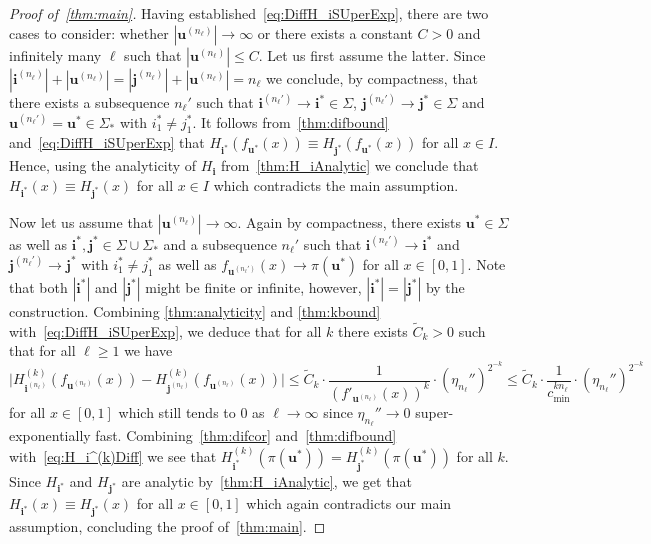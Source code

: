 \documentclass[12pt,]{article}
\def\cref#1{\ref{#1}}%
\theoremstyle{definition}
\theoremstyle{remark}
\newcommand{\0}{\mathbf{0}}
\newcommand{\bi}{\mathbf{i}}
\newcommand{\bj}{\mathbf{j}}
\newcommand{\bu}{\mathbf{u}}
\begin{document}
\begin{proof}[Proof of~\cref{thm:main}]
Having established~\cref{eq:DiffH_iSUperExp}, there are two cases to consider: whether
$|\bu^{(n_\ell)}| \to \infty$ or there exists a constant $C>0$ and infinitely many $\ell$ such that
$|\bu^{(n_\ell)}| \leq C$. Let us first assume the latter. Since $|\bi^{(n_\ell)}|+ |\bu^{(n_\ell)}|
= |\bj^{(n_\ell)}|+|\bu^{(n_\ell)}| = n_\ell$ we conclude, by compactness, that
there exists a subsequence $n_\ell'$ such that $\bi^{(n_\ell')} \to \bi^*\in\Sigma$,
$\bj^{(n_\ell')}\to\bj^*\in\Sigma$ and $\bu^{(n_\ell')}=\bu^*\in\Sigma_*$ with $i_1^*\neq j_1^*$.
It follows from~\cref{thm:difbound} and~\cref{eq:DiffH_iSUperExp} that
$
  H_{\bi^*}(f_{\bu^*}(x))\equiv H_{\bj^*}(f_{\bu^*}(x))
$
for all $x\in I$.  Hence, using the analyticity of $H_{\bi}$ from~\cref{thm:H_iAnalytic} we conclude
that $H_{\bi^*}(x) \equiv H_{\bj^*}(x)$ for all $x\in I$ which contradicts the main assumption.

Now let us assume that $|\bu^{(n_\ell)}| \to \infty$. Again by compactness, there exists
$\bu^*\in\Sigma$ as well as $\bi^*,\bj^*\in\Sigma\cup\Sigma_*$  and a
subsequence $n_\ell'$ such that $\bi^{(n_\ell')}\to \bi^*$ and $\bj^{(n_\ell')}\to \bj^*$ with
$i_1^*\neq j_1^*$ as well as $f_{\bu^{(n_\ell')}}(x) \to \pi(\bu^*)$ for all $x\in[0,1]$. Note that both $|\bi^*|$ and
	$|\bj^*|$ might be finite or infinite, however, $|\bi^*|=|\bj^*|$ by the construction. Combining
\cref{thm:analyticity} and \cref{thm:kbound} with~\cref{eq:DiffH_iSUperExp}, we deduce that for all
$k$ there
exists $\widetilde{C}_k>0$ such that for all $\ell\geq 1$ we have
\begin{equation}\label{eq:H_i^(k)Diff}
  \big|H_{\bi^{(n_\ell)}}^{(k)}(f_{\bu^{(n_\ell)}}(x)) - H_{\bj^{(n_\ell)}}^{(k)}(f_{\bu^{(n_\ell)}}(x))\big|
  \leq \widetilde{C}_k \cdot
  \frac{1}{(f'_{\bu^{(n_\ell)}}(x))^k}\cdot\left(\eta_{n_\ell}''\right)^{2^{-k}}\leq\widetilde{C}_k
  \cdot \frac{1}{c_{\min}^{k n_\ell}}\cdot\left(\eta_{n_\ell}''\right)^{2^{-k}}
\end{equation}
for all $x\in[0,1]$ which still tends to $0$ as $\ell\to\infty$ since $\eta_{n_{\ell}}''\to 0$
super-exponentially fast. Combining~\cref{thm:difcor} and~\cref{thm:difbound}
with~\cref{eq:H_i^(k)Diff} we see that $H_{\bi^*}^{(k)}(\pi(\bu^*))=H_{\bj^*}^{(k)}(\pi(\bu^*))$ for
all $k$.
Since $H_{\bi^*}$ and $H_{\bj^*}$ are analytic by~\cref{thm:H_iAnalytic}, we get that
$H_{\bi^*}(x)\equiv H_{\bj^*}(x)$ for all
$x\in[0,1]$ which again contradicts our main assumption, concluding the proof of~\cref{thm:main}. 
\end{proof}
\end{document}
